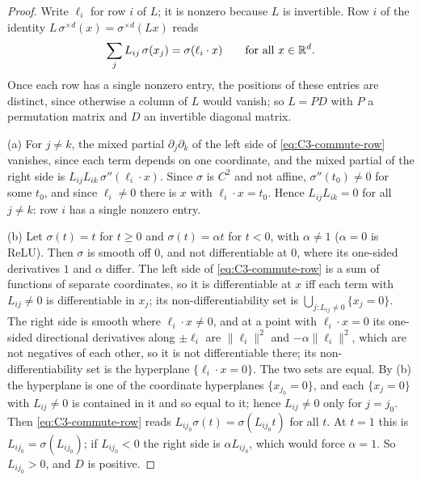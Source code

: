 \begin{proof}
Write $\ell_i$ for row $i$ of $L$; it is nonzero because $L$ is invertible. Row $i$ of the identity
$L\,\sigma^{\times d}(x)=\sigma^{\times d}(Lx)$ reads
\begin{equation}\label{eq:C3-commute-row}
\sum_jL_{ij}\,\sigma(x_j)=\sigma(\ell_i\cdot x)\qquad\text{for all }x\in\R^d .
\end{equation}
Once each row has a single nonzero entry, the positions of these entries are distinct, since otherwise a column of $L$
would vanish; so $L=PD$ with $P$ a permutation matrix and $D$ an invertible diagonal matrix.

(a) For $j\ne k$, the mixed partial $\partial_j\partial_k$ of the left side of \eqref{eq:C3-commute-row} vanishes, since each
term depends on one coordinate, and the mixed partial of the right side is $L_{ij}L_{ik}\,\sigma''(\ell_i\cdot x)$. Since
$\sigma$ is $C^2$ and not affine, $\sigma''(t_0)\ne0$ for some $t_0$, and since $\ell_i\ne0$ there is $x$ with $\ell_i\cdot
x=t_0$. Hence $L_{ij}L_{ik}=0$ for all $j\ne k$: row $i$ has a single nonzero entry.

(b) Let $\sigma(t)=t$ for $t\ge0$ and $\sigma(t)=\alpha t$ for $t<0$, with $\alpha\ne1$ ($\alpha=0$ is ReLU). Then $\sigma$ is
smooth off $0$, and not differentiable at $0$, where its one-sided derivatives $1$ and $\alpha$ differ. The left side of
\eqref{eq:C3-commute-row} is a sum of functions of separate coordinates, so it is differentiable at $x$ iff each term with
$L_{ij}\ne0$ is differentiable in $x_j$; its non-differentiability set is $\bigcup_{j:L_{ij}\ne0}\{x_j=0\}$. The right side is
smooth where $\ell_i\cdot x\ne0$, and at a point with $\ell_i\cdot x=0$ its one-sided directional derivatives along $\pm\ell_i$
are $\lVert\ell_i\rVert^2$ and $-\alpha\lVert\ell_i\rVert^2$, which are not negatives of each other, so it is not
differentiable there; its non-differentiability set is the hyperplane $\{\ell_i\cdot x=0\}$. The two sets are equal. By
(b) the hyperplane is one of the coordinate hyperplanes $\{x_{j_0}=0\}$, and each $\{x_j=0\}$ with $L_{ij}\ne0$
is contained in it and so equal to it; hence $L_{ij}\ne0$ only for $j=j_0$. Then \eqref{eq:C3-commute-row} reads
$L_{ij_0}\sigma(t)=\sigma(L_{ij_0}t)$ for all $t$. At $t=1$ this is $L_{ij_0}=\sigma(L_{ij_0})$; if $L_{ij_0}<0$ the right side
is $\alpha L_{ij_0}$, which would force $\alpha=1$. So $L_{ij_0}>0$, and $D$ is positive.


\end{proof}
